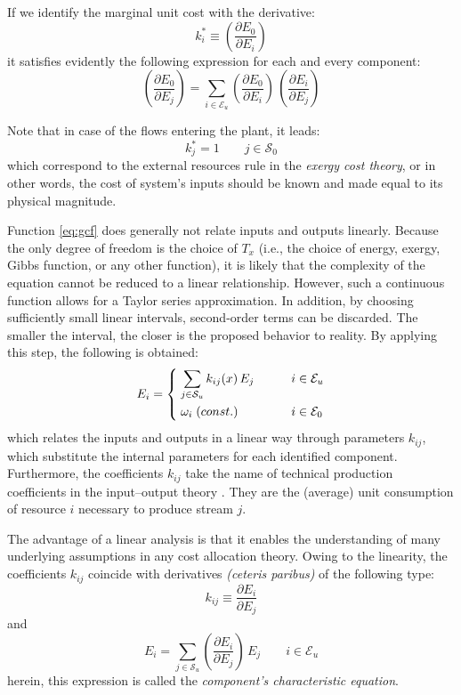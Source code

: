 \documentclass[energies,article,submit,moreauthors,pdftex]{Definitions/mdpi}
\newcommand{\dpartial}[2]{\left(\dfrac{\partial E_{#1}}{\partial E_{#2}}\right)}
\begin{document}
If we identify the marginal unit cost with the derivative:
\begin{equation}
k_i^*\equiv\dpartial{0}{i}
\end{equation}
it satisfies evidently the following expression for each and every component:
\begin{equation}
\dpartial{0}{j}=\sum_{i\in\mathcal{E}_u}{\dpartial{0}{i}\,\dpartial{i}{j}}
\label{eq:mcost}
\end{equation}

Note that in case of the flows entering the plant, it leads:
\begin{equation}
k_{j}^{*}=1 \qquad j\in\mathcal{S}_0
\end{equation}
which correspond to the external resources rule in the \emph{exergy cost theory}, or in other words, the cost of system's inputs should be known and made equal to its physical magnitude. 

Function \cref{eq:gcf} does generally not relate inputs and outputs linearly. Because the only degree of freedom is the choice of $T_x$ (i.e., the choice of energy, exergy, Gibbs function, or any other function), it is likely that the complexity of the equation cannot be reduced to a linear relationship.
However, such a continuous function allows for a Taylor series approximation. In addition, by choosing sufficiently small linear intervals, second-order terms can be discarded. The smaller the interval, the closer is the proposed behavior to reality. By applying this step, the following is obtained:
\begin{equation}
    E_i=\begin{dcases}
    \;\sum\limits_{j\in\mathcal{S}_u}{k_{ij}(x)\,E_j} \qquad &i\in\mathcal{E}_u \\
    \;\omega_i\;\text(const.) \qquad &i\in\mathcal{E}_0
    \end{dcases}
    \label{eq:echar}
\end{equation}
which relates the inputs and outputs in a linear way through parameters $k_{ij}$, which substitute the internal parameters for each identified component. Furthermore, the coefficients $k_{ij}$ take the name of technical production coefficients in the input–output theory \cite{Leontief1970}. They are the (average) unit consumption of resource $i$ necessary to produce stream $j$.

The advantage of a linear analysis is that it enables the understanding of many underlying assumptions in any cost allocation theory. Owing to the linearity, the coefficients $k_{ij}$ coincide with derivatives \emph{(ceteris paribus)} of the following type:
\begin{equation}
    k_{ij}\equiv\dfrac{\partial E_{i}}{\partial E_{j}}
\end{equation}
and
\begin{equation}
    E_i=\sum_{j\in\mathcal{S}_u}{\dpartial{i}{j}\,E_j} \qquad i\in\mathcal{E}_u
    \label{eq:deqchar}
\end{equation}
herein, this expression is called the \emph{component's characteristic equation}.
\end{document}
